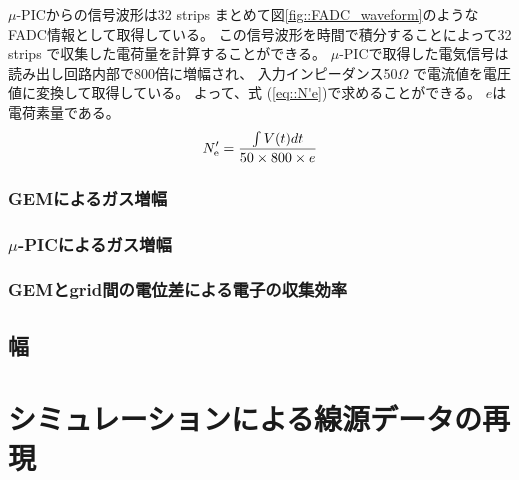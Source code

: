 $\mu$-PICからの信号波形は32 strips まとめて図\ref{fig::FADC_waveform}のようなFADC情報として取得している。
この信号波形を時間で積分することによって32 strips で収集した電荷量を計算することができる。
$\mu$-PICで取得した電気信号は読み出し回路内部で800倍に増幅され、
入力インピーダンス50$\Omega$ で電流値を電圧値に変換して取得している。
よって、式 (\ref{eq::N'e})で求めることができる。
$e$は電荷素量である。
\begin{equation}
  N'_{\rm e} = \frac{\int V (t) dt}{ 50 \times 800 \times e}
  \label{eq::N'e}
\end{equation}

\subsubsection{GEMによるガス増幅}

\subsubsection{$\mu$-PICによるガス増幅}

\subsubsection{GEMとgrid間の電位差による電子の収集効率}

\subsection{幅}

\section{シミュレーションによる線源データの再現}

